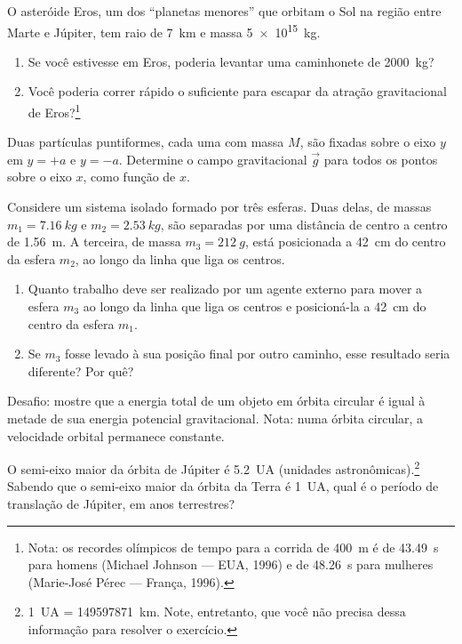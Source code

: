 \documentclass[a4paper]{article}
\begin{document}
\begin{exercicio}
 O asteróide Eros, um dos ``planetas menores'' que orbitam o Sol na região entre Marte e Júpiter, tem raio de \SI{7}{km} e massa \SI{5e15}{kg}.
\begin{enumerate}
\item Se você estivesse em Eros, poderia levantar uma caminhonete de \SI{2000}{kg}?
\item Você poderia correr rápido o suficiente para escapar da atração gravitacional de Eros?\footnote{Nota: os recordes olímpicos de tempo para a corrida de \SI{400}{m} é de \SI{43.49}{s} para homens (Michael Johnson --- EUA, 1996) e de \SI{48.26}{s} para mulheres (Marie-José Pérec --- França, 1996).}
\end{enumerate}
\end{exercicio}

\begin{exercicio}
 Duas partículas puntiformes, cada uma com massa $M$, são fixadas sobre o eixo $y$ em $y=+a$ e $y=-a$.
Determine o campo gravitacional $\vec g$ para todos os pontos sobre o eixo $x$, como função de $x$.
\end{exercicio}

\begin{exercicio}
 Considere um sistema isolado formado por três esferas. Duas delas, de massas $m_1 = \SI{7.16}{kg}$ e $m_2 = \SI{2.53}{kg}$, são separadas por uma distância de centro a centro de \SI{1.56}{m}. A terceira, de massa $m_3 = \SI{212}{g}$, está posicionada a \SI{42}{cm} do centro da esfera $m_2$, ao longo da linha que liga os centros.
\begin{enumerate}
\item Quanto trabalho deve ser realizado por um agente externo para mover a esfera $m_3$ ao longo da linha que liga os centros e posicioná-la a \SI{42}{cm} do centro da esfera $m_1$.
\item Se $m_3$ fosse levado à sua posição final por outro caminho, esse resultado seria diferente? Por quê?
\end{enumerate}
\end{exercicio}

\begin{exercicio}
 Desafio: mostre que a energia total de um objeto em órbita circular é igual à metade de sua energia potencial gravitacional.
Nota: numa órbita circular, a velocidade orbital permanece constante.
\end{exercicio}

\begin{exercicio}
 O semi-eixo maior da órbita de Júpiter é \SI{5.2}{UA} (unidades astronômicas).\footnote{\SI{1}{UA} = \SI{149 597 871}{km}. Note, entretanto, que você não precisa dessa informação para resolver o exercício.}
Sabendo que o semi-eixo maior da órbita da Terra é \SI{1}{UA}, qual é o período de translação de Júpiter, em anos terrestres?
\end{exercicio}
\end{document}
